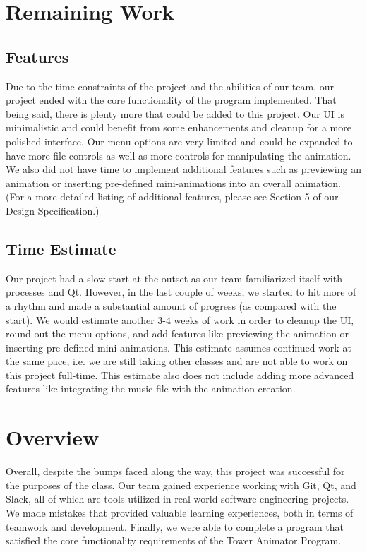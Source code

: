 \documentclass[12pt]{article}
\begin{document}
	\clearpage
	\section{Remaining Work}
	\subsection{Features}
	Due to the time constraints of the project and the abilities of our team, our project ended with  the core functionality of the program implemented. That being said, there is plenty more that could be added to this project. Our UI is minimalistic and could benefit from some enhancements and cleanup for a more polished interface. Our menu options are very limited and could be expanded to have more file controls as well as more controls for manipulating the animation. We also did not have time to implement additional features such as previewing an animation or inserting pre-defined mini-animations into an overall animation. (For a more detailed listing of additional features, please see Section 5 of our Design Specification.)
	\subsection{Time Estimate}
	Our project had a slow start at the outset as our team familiarized itself with processes and Qt. However, in the last couple of weeks, we started to hit more of a rhythm and made a substantial amount of progress (as compared with the start). We would estimate another 3-4 weeks of work in order to cleanup the UI, round out the menu options, and add features like previewing the animation or inserting pre-defined mini-animations. This estimate assumes continued work at the same pace, i.e. we are still taking other classes and are not able to work on this project full-time. This estimate also does not include adding more advanced features like integrating the music file with the animation creation.
	
	\clearpage
	\section{Overview}
	Overall, despite the bumps faced along the way, this project was successful for the purposes of the class. Our team gained experience working with Git, Qt, and Slack, all of which are tools utilized in real-world software engineering projects. We made mistakes that provided valuable learning experiences, both in terms of teamwork and development. Finally, we were able to complete a program that satisfied the core functionality requirements of the Tower Animator Program.
\end{document}
